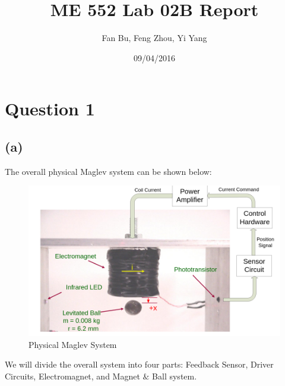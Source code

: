 \documentclass[letterpaper]{article}
\author{Fan Bu, Feng Zhou, Yi Yang}
\title{ME 552 Lab 02B Report}
\begin{document}
\date{09/04/2016}
\maketitle

\newcommand{\trace}{\mathrm{trace}}
\newcommand{\real}{\mathbb R}  %
\newcommand{\nat}{\mathbb N}   %
\newcommand{\cp}{\mathbb C}    %
\newcommand{\ds}{\displaystyle}
\newcommand{\mf}[2]{\frac{\ds #1}{\ds #2}}
\newcommand{\spanof}[1]{\textrm{span} \{ #1 \}}
\newcommand{\sol}[0]{\textbf{Solution: }}
\newcommand{\pf}[0]{\textbf{Proof:}}
\newcommand{\rme}[0]{\textrm{e}}
\newcommand{\Null}[1]{\textrm{Null}\{#1\}}
\parindent 0pt
\section*{Question 1}
\subsection*{(a)}
The overall physical Maglev system can be shown below:
\begin{figure}[H]
	\centering
	\includegraphics[scale=0.3]{Maglev.png}
	\caption{Physical Maglev System}
\end{figure}
We will divide the overall system into four parts: Feedback Sensor, Driver Circuits, Electromagnet, and Magnet $\&$ Ball system.\\
\end{document}
